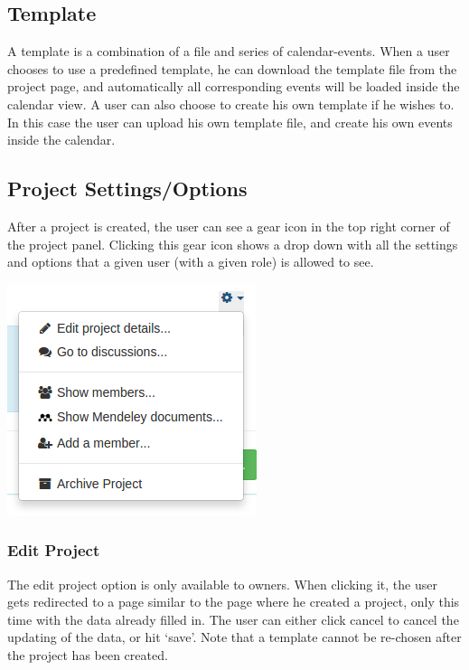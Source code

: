 \subsection{Template}
A template is a combination of a file and series of calendar-events. When a user chooses to use a predefined template, he can download the template file from the project page, and automatically all corresponding events will be loaded inside the calendar view. A user can also choose to create his own template if he wishes to. In this case the user can upload his own template file, and create his own events inside the calendar.

\subsection{Project Settings/Options}
After a project is created, the user can see a gear icon in the top right corner of the project panel. Clicking this gear icon shows a drop down with all the settings and options that a given user (with a given role) is allowed to see.

\begin{center}
\includegraphics[scale=0.5]{./img/project_dropdown.png}
\end{center}

\subsubsection{Edit Project}

The edit project option is only available to owners. When clicking it, the user gets redirected to a page similar to the page where he created a project, only this time with the data already filled in. The user can either click cancel to cancel the updating of the data, or hit `save'. Note that a template cannot be re-chosen after the project has been created.

